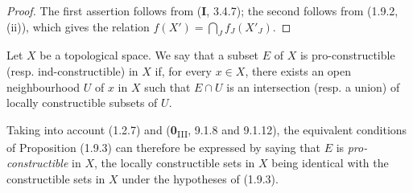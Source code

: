\begin{proof}
The first assertion follows from (\textbf{I}, 3.4.7); the second follows from (1.9.2,
(ii)), which gives the relation $f(X')=\bigcap_Jf_J(X'_J)$.
\end{proof}

\begin{definition}[1.9.4]
\label{IV.1.9.4}
Let $X$ be a topological space. We say that a subset $E$ of $X$ is
pro-constructible \textup{(resp.} ind-constructible\textup{)} in $X$ if, for
every $x\in X$, there exists an open neighbourhood $U$ of $x$ in $X$ such that
$E\cap U$ is an intersection \textup{(resp.} a union\textup{)} of locally constructible subsets
of $U$.
\end{definition}

Taking into account (1.2.7) and (\textbf{0}\textsubscript{III}, 9.1.8 and 9.1.12), the
equivalent conditions of Proposition (1.9.3) can therefore be expressed by
saying that $E$ is \emph{pro-constructible} in $X$, the locally constructible
sets in $X$ being identical with the constructible sets in $X$ under the
hypotheses of (1.9.3).


